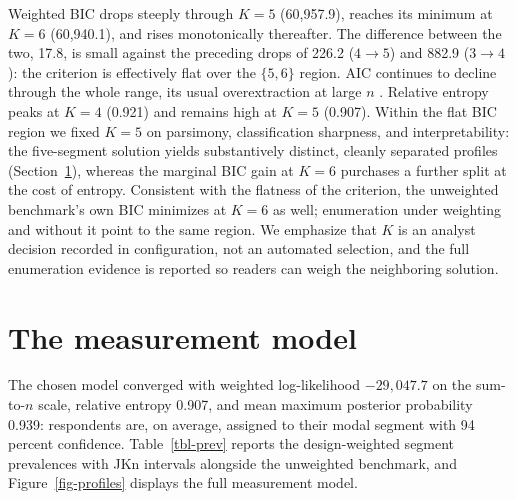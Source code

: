 \documentclass[
  12pt]{article}
\begin{document}
Weighted BIC drops steeply through \(K = 5\) (60,957.9), reaches its
minimum at \(K = 6\) (60,940.1), and rises monotonically thereafter. The
difference between the two, 17.8, is small against the preceding drops
of 226.2 (\(4 \to 5\)) and 882.9 (\(3 \to 4\)): the criterion is
effectively flat over the \(\{5, 6\}\) region. AIC continues to decline
through the whole range, its usual overextraction at large \(n\)
\citep{nylund2007}. Relative entropy peaks at \(K = 4\) (0.921) and
remains high at \(K = 5\) (0.907). Within the flat BIC region we fixed
\(K = 5\) on parsimony, classification sharpness, and interpretability:
the five-segment solution yields substantively distinct, cleanly
separated profiles (Section~\ref{sec-measurement}), whereas the marginal
BIC gain at \(K = 6\) purchases a further split at the cost of entropy.
Consistent with the flatness of the criterion, the unweighted
benchmark's own BIC minimizes at \(K = 6\) as well; enumeration under
weighting and without it point to the same region. We emphasize that
\(K\) is an analyst decision recorded in configuration, not an automated
selection, and the full enumeration evidence is reported so readers can
weigh the neighboring solution.

\section{The measurement model}\label{sec-measurement}

The chosen model converged with weighted log-likelihood \(-29{,}047.7\)
on the sum-to-\(n\) scale, relative entropy 0.907, and mean maximum
posterior probability 0.939: respondents are, on average, assigned to
their modal segment with 94 percent confidence. Table~\ref{tbl-prev}
reports the design-weighted segment prevalences with JKn intervals
alongside the unweighted benchmark, and Figure~\ref{fig-profiles}
displays the full measurement model.
\end{document}
